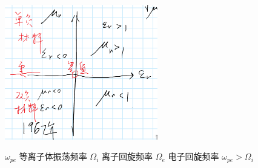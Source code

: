 \begin{center}
\includegraphics[width=0.5\textwidth]{figures/2022-11-14T221055+0800.png}
\end{center}

\(\omega_{pe}\) 等离子体振荡频率
\(\Omega_i\) 离子回旋频率
\(\Omega_e\) 电子回旋频率
\(\omega_{pe} > \Omega_i \)





